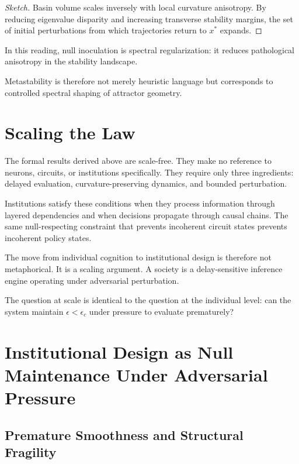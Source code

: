 \documentclass[11pt]{article}
\theoremstyle{remark}
\begin{document}
\begin{proof}[Sketch]
Basin volume scales inversely with local curvature anisotropy. By reducing eigenvalue disparity and increasing transverse stability margins, the set of initial perturbations from which trajectories return to $x^*$ expands.
\end{proof}

In this reading, null inoculation is spectral regularization: it reduces pathological anisotropy in the stability landscape.

Metastability is therefore not merely heuristic language but corresponds to controlled spectral shaping of attractor geometry.


\section{Scaling the Law}
\label{sec:scaling}

The formal results derived above are scale-free. They make no reference to neurons, circuits, or institutions specifically. They require only three ingredients: delayed evaluation, curvature-preserving dynamics, and bounded perturbation.

Institutions satisfy these conditions when they process information through layered dependencies and when decisions propagate through causal chains. The same null-respecting constraint that prevents incoherent circuit states prevents incoherent policy states.

The move from individual cognition to institutional design is therefore not metaphorical. It is a scaling argument. A society is a delay-sensitive inference engine operating under adversarial perturbation.

The question at scale is identical to the question at the individual level: can the system maintain $\epsilon < \epsilon_c$ under pressure to evaluate prematurely?

\section{Institutional Design as Null Maintenance Under Adversarial Pressure}
\label{sec:institutional}

\subsection{Premature Smoothness and Structural Fragility}
\end{document}
